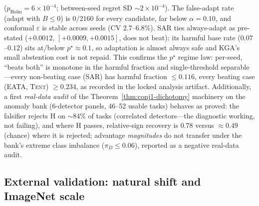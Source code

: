 \documentclass[conference]{IEEEtran}
\theoremstyle{plain}
\theoremstyle{definition}
\begin{document}
($p_{\mathrm{Holm}}{=}6\times10^{-4}$; between-seed regret SD ${\sim}2\times10^{-4}$).
The false-adapt rate (adapt with $B\le0$) is $0/2160$ for every candidate, far below
$\alpha{=}0.10$, and conformal $\varepsilon$ is stable across seeds (CV $2.7$--$6.8\%$).
\textsc{SAR} ties always-adapt as pre-stated ($+0.0012$, $[+0.0009,+0.0015]$, does
not beat): its harmful base rate ($0.07$--$0.12$) sits at/below $p^\star{\approx}0.1$,
so adaptation is almost always safe and \textsc{KGA}'s small abstention cost is not
repaid. This confirms the $p^\star$ regime law: per-seed, ``beats both'' is monotone
in the harmful fraction and single-threshold separable---every non-beating case
(\textsc{SAR}) has harmful fraction $\le0.116$, every beating case (\textsc{EATA},
\textsc{Tent}) $\ge0.234$, as recorded in the locked analysis artifact. Additionally,
a first \emph{real-data audit} of the
Theorem~\ref{thm:conj1-dichotomy} machinery on the anomaly bank (6-detector panels,
46--52 usable tasks) behaves as proved: the falsifier rejects H on ${\sim}84\%$ of
tasks (correlated detectors---the diagnostic working, not failing), and where H passes,
relative-sign recovery is $0.78$ versus ${\approx}0.49$ (chance) where it is rejected;
advantage \emph{magnitudes} do not transfer under the bank's extreme class imbalance
($\pi_D\le0.06$), reported as a negative real-data audit.

\subsection{External validation: natural shift and ImageNet scale}\label{sec:external}
\end{document}
